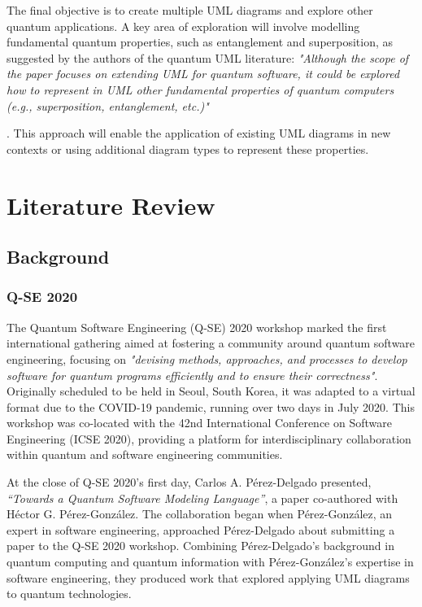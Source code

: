 \documentclass{article}
\begin{document}
The final objective is to create multiple UML diagrams and explore other quantum applications. A key area of exploration will involve modelling fundamental quantum properties, such as entanglement and superposition, as suggested by the authors of the quantum UML literature: \textit{"Although the scope of the paper focuses on extending UML for quantum software, it
could be explored how to represent in UML other fundamental properties of quantum
computers (e.g., superposition, entanglement, etc.)"}{\cite{Pérez-Castillo2022}. This approach will enable the application of existing UML diagrams in new contexts or using additional diagram types to represent these properties.

\section{Literature Review}

\subsection{Background}

\subsubsection{Q-SE 2020}

The Quantum Software Engineering (Q-SE) 2020 workshop marked the first international gathering aimed at fostering a community around quantum software engineering, focusing on \textit{"devising methods, approaches, and processes to develop software for quantum programs efficiently and to ensure their correctness"}\cite{QSE2020}. Originally scheduled to be held in Seoul, South Korea, it was adapted to a virtual format due to the COVID-19 pandemic, running over two days in July 2020. This workshop was co-located with the 42nd International Conference on Software Engineering (ICSE 2020), providing a platform for interdisciplinary collaboration within quantum and software engineering communities.

At the close of Q-SE 2020's first day, Carlos A. Pérez-Delgado presented, \textit{“Towards a Quantum Software Modeling Language”}\cite{Perez-Delgado2020}, a paper co-authored with Héctor G. Pérez-González. The collaboration began when Pérez-González, an expert in software engineering, approached Pérez-Delgado about submitting a paper to the Q-SE 2020 workshop. Combining Pérez-Delgado’s background in quantum computing and quantum information with Pérez-González's expertise in software engineering, they produced work that explored applying UML diagrams to quantum technologies\cite{Towards}. 

}
\end{document}
